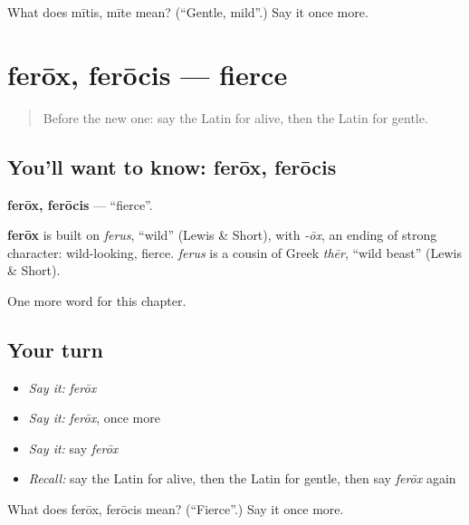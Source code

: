\begin{tcolorbox}[breakable,colback=teal!4,colframe=teal!35!black,title={Before you move on}]
What does mītis, mīte mean? (\textquotedblleft{}Gentle, mild\textquotedblright{}.) Say it once more.
\end{tcolorbox}
\section[ferōx, ferōcis]{ferōx, ferōcis — fierce}

\label{lesson:LA-C145-ferox}



\begin{quote}
Before the new one: say the Latin for alive, then the Latin for gentle.
\end{quote}

\subsection*{You'll want to know: ferōx, ferōcis}
\textbf{ferōx, ferōcis} — \textquotedblleft{}fierce\textquotedblright{}.

\begin{cousinweb}
\textbf{ferōx} is built on \emph{ferus}, \textquotedblleft{}wild\textquotedblright{} (Lewis \& Short), with \emph{-ōx}, an ending of strong character: wild-looking, fierce. \emph{ferus} is a cousin of Greek \emph{thēr}, \textquotedblleft{}wild beast\textquotedblright{} (Lewis \& Short).
\end{cousinweb}

\begin{grammarlens}[title={What you've built}]
One more word for this chapter.
\end{grammarlens}

\subsection*{Your turn}
\begin{itemize}
\raggedright
  \item \emph{Say it:} \emph{ferōx}
  \item \emph{Say it:} \emph{ferōx}, once more
  \item \emph{Say it:} say \emph{ferōx}
  \item \emph{Recall:} say the Latin for alive, then the Latin for gentle, then say \emph{ferōx} again
\end{itemize}

\begin{tcolorbox}[breakable,colback=teal!4,colframe=teal!35!black,title={Before you move on}]
What does ferōx, ferōcis mean? (\textquotedblleft{}Fierce\textquotedblright{}.) Say it once more.
\end{tcolorbox}
